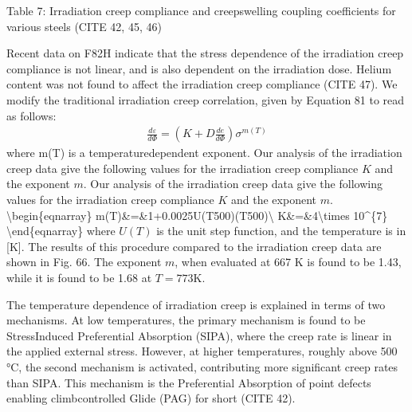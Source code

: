 \documentclass[letterpaper,10pt,english]{jupyterBook}
\begin{document}
	\sphinxAtStartPar
	Table 7: Irradiation creep compliance and creep\sphinxhyphen{}swelling coupling coefficients for various steels (CITE 42, 45, 46)
	
	\sphinxAtStartPar
	Recent data on F82H indicate that the stress dependence of the irradiation creep compliance is not linear, and is also dependent on the irradiation dose.  Helium content was not found to affect the irradiation creep compliance (CITE 47). We modify the traditional irradiation creep correlation, given by Equation 81 to read as follows:
	\begin{equation*}
		\begin{split} \frac{d\varepsilon}{d\Phi}=(K+D\frac{de}{d\Phi})\sigma^{m(T)} \end{split}
	\end{equation*}
	\sphinxAtStartPar
	where m(T) is a temperature\sphinxhyphen{}dependent exponent. Our analysis of the irradiation creep data give the following values for the irradiation creep compliance \(K\) and the exponent \(m\). Our analysis of the irradiation creep data give the following values for the irradiation creep compliance \(K\) and the exponent \(m\).\\
	\textbackslash{}begin\{eqnarray\}
	m(T)\&=\&1+0.0025U(T\sphinxhyphen{}500)(T\sphinxhyphen{}500)\textbackslash{}
	K\&=\&4\textbackslash{}times 10\textasciicircum{}\{\sphinxhyphen{}7\}
	\textbackslash{}end\{eqnarray\}
	where \(U(T)\) is the unit step function, and the temperature is in {[}K{]}.  The results of this procedure compared to the irradiation creep data are shown in Fig. 66. The exponent \(m\), when evaluated at 667 K is found to be 1.43, while it is found to be 1.68 at \(T = 773 \text{K}\).
	
	\sphinxAtStartPar
	The temperature dependence of irradiation creep is explained in terms of two mechanisms. At low temperatures, the primary mechanism is found to be Stress\sphinxhyphen{}Induced Preferential Absorption (SIPA), where the creep rate is linear in the applied external stress. However, at higher temperatures, roughly above 500 °C, the second mechanism is activated, contributing more significant creep rates than SIPA. This mechanism is the Preferential Absorption of point defects enabling climb\sphinxhyphen{}controlled Glide (PAG) for short (CITE 42).
	
\end{document}

